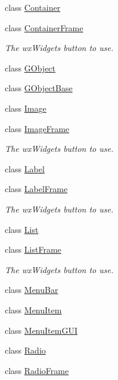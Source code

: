 \begin{DoxyCompactItemize}
class \mbox{\hyperlink{class_rad_j_a_v_1_1_g_u_i_1_1_container}{Container}}
\item 
class \mbox{\hyperlink{class_rad_j_a_v_1_1_g_u_i_1_1_container_frame}{Container\+Frame}}
\begin{DoxyCompactList}\small\item\em The wx\+Widgets button to use. \end{DoxyCompactList}\item 
class \mbox{\hyperlink{class_rad_j_a_v_1_1_g_u_i_1_1_g_object}{G\+Object}}
\item 
class \mbox{\hyperlink{class_rad_j_a_v_1_1_g_u_i_1_1_g_object_base}{G\+Object\+Base}}
\item 
class \mbox{\hyperlink{class_rad_j_a_v_1_1_g_u_i_1_1_image}{Image}}
\item 
class \mbox{\hyperlink{class_rad_j_a_v_1_1_g_u_i_1_1_image_frame}{Image\+Frame}}
\begin{DoxyCompactList}\small\item\em The wx\+Widgets button to use. \end{DoxyCompactList}\item 
class \mbox{\hyperlink{class_rad_j_a_v_1_1_g_u_i_1_1_label}{Label}}
\item 
class \mbox{\hyperlink{class_rad_j_a_v_1_1_g_u_i_1_1_label_frame}{Label\+Frame}}
\begin{DoxyCompactList}\small\item\em The wx\+Widgets button to use. \end{DoxyCompactList}\item 
class \mbox{\hyperlink{class_rad_j_a_v_1_1_g_u_i_1_1_list}{List}}
\item 
class \mbox{\hyperlink{class_rad_j_a_v_1_1_g_u_i_1_1_list_frame}{List\+Frame}}
\begin{DoxyCompactList}\small\item\em The wx\+Widgets button to use. \end{DoxyCompactList}\item 
class \mbox{\hyperlink{class_rad_j_a_v_1_1_g_u_i_1_1_menu_bar}{Menu\+Bar}}
\item 
class \mbox{\hyperlink{class_rad_j_a_v_1_1_g_u_i_1_1_menu_item}{Menu\+Item}}
\item 
class \mbox{\hyperlink{class_rad_j_a_v_1_1_g_u_i_1_1_menu_item_g_u_i}{Menu\+Item\+G\+UI}}
\item 
class \mbox{\hyperlink{class_rad_j_a_v_1_1_g_u_i_1_1_radio}{Radio}}
\item 
class \mbox{\hyperlink{class_rad_j_a_v_1_1_g_u_i_1_1_radio_frame}{Radio\+Frame}}

\end{DoxyCompactItemize}
